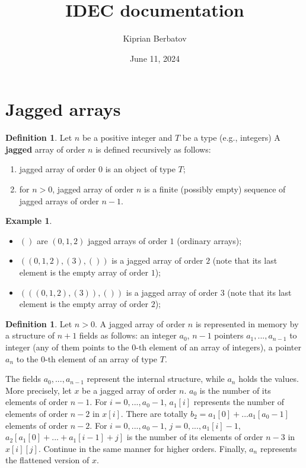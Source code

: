 \documentclass[fleqn]{article}
\title{IDEC documentation}
\author{Kiprian Berbatov}
\date{June 11, 2024}
\theoremstyle{definition}
\newtheorem{definition}[theorem]{Definition}
\newtheorem{example}[theorem]{Example}
\begin{document}
\maketitle

\section{Jagged arrays}

\begin{definition}
  Let $n$ be a positive integer and $T$ be a type (e.g., integers)
  A \textbf{jagged} array of order $n$ is defined recursively as follows:
  \begin{enumerate}
    \item
      jagged array of order $0$ is an object of type $T$;
    \item
      for $n > 0$, jagged array of order $n$ is a finite (possibly empty)
      sequence of jagged arrays of order $n - 1$.
  \end{enumerate}
\end{definition}

\begin{example}
  \begin{itemize}
    \item
      $()$ are $(0, 1, 2)$ jagged arrays of order $1$ (ordinary arrays);
    \item
      $((0, 1, 2), (3), ())$ is a jagged array of order $2$
      (note that its last element is the empty array of order $1$);
    \item
      $(((0, 1, 2), (3)),())$ is a jagged array of order $3$
      (note that its last element is the empty array of order $2$);
  \end{itemize}
\end{example}

\begin{definition}
  Let $n > 0$.
  A jagged array of order $n$ is represented in memory by a structure of $n + 1$
  fields as follows:
  an integer $a_0$,
  $n - 1$ pointers $a_1, ..., a_{n - 1}$ to integer
  (any of them points to the  $0$-th element of an array of integers),
  a pointer $a_n$ to the $0$-th element of an array of type $T$.
  
  The fields $a_0, ..., a_{n - 1}$ represent the internal structure,
  while $a_n$ holds the values.
  More precisely, let $x$ be a jagged array of order $n$.
  $a_0$ is the number of its elements of order $n - 1$.
  For $i = 0, ..., a_0 - 1$,
  $a_1[i]$ represents the number of elements of order $n - 2$ in $x[i]$.
  There are totally $b_2 = a_1[0] + ... a_1[a_0 - 1]$ elements of order $n - 2$.
  For $i = 0, ..., a_0 - 1$, $j  = 0, ..., a_1[i] - 1$,
  $a_2[a_1[0] + ... + a_1[i - 1] + j]$
  is the number of its elements of order $n - 3$ in $x[i][j]$.
  Continue in the same manner for higher orders.
  Finally, $a_n$ represents the flattened version of $x$.
\end{definition}
\end{document}
